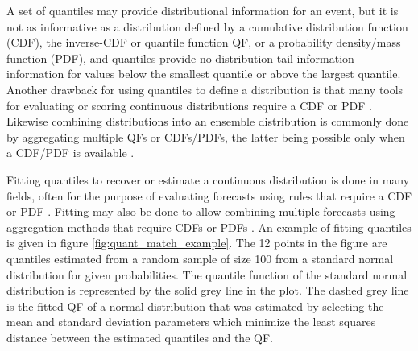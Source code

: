 \documentclass[preprint,12pt,authoryear]{elsarticle}
\newcommand{\1}[1]{\mathds{1}\left[#1\right]}
\begin{document}
A set of quantiles may provide distributional information for an event, but it 
is not as informative as a distribution defined by a cumulative distribution 
function (CDF), the inverse-CDF or quantile function QF, or a probability 
density/mass function (PDF), and quantiles provide no distribution tail 
information --information for values below the smallest quantile or above the 
largest quantile. Another drawback for using quantiles to define a distribution 
is that many tools for evaluating or scoring continuous distributions require 
a CDF or PDF
\cite[]{gneiting2007strictly,gneiting2014probabilistic}. Likewise combining 
distributions into an ensemble distribution is commonly 
done by aggregating multiple QFs or 
CDFs/PDFs, the latter being possible only when a CDF/PDF is available 
\cite[]{gneiting2005calibrated,wang2023forecast}.

Fitting quantiles to recover or estimate a continuous distribution is done in 
many fields, often for the purpose of evaluating forecasts using rules that 
require a CDF or PDF \cite[]{simpson2023interpolating, gerding2023evaluating}. 
Fitting may also be done to allow combining multiple forecasts using aggregation 
methods that require CDFs or PDFs 
\cite[]{gyamerah2020probabilistic,li2019combining,baran2018combining,
bogner2017combining,he2016short,gneiting2005calibrated}. 
An example of fitting quantiles is given in figure 
\ref{fig:quant_match_example}. The 12 points in the figure are quantiles 
estimated from a random sample of size 100 from a standard normal distribution 
for given probabilities. The quantile function of the standard normal 
distribution is represented by the solid grey line in the plot. 
The dashed grey line is the fitted QF of a normal 
distribution that was estimated by selecting the mean and standard deviation 
parameters which minimize the least squares distance between the estimated 
quantiles and the QF.
\end{document}
